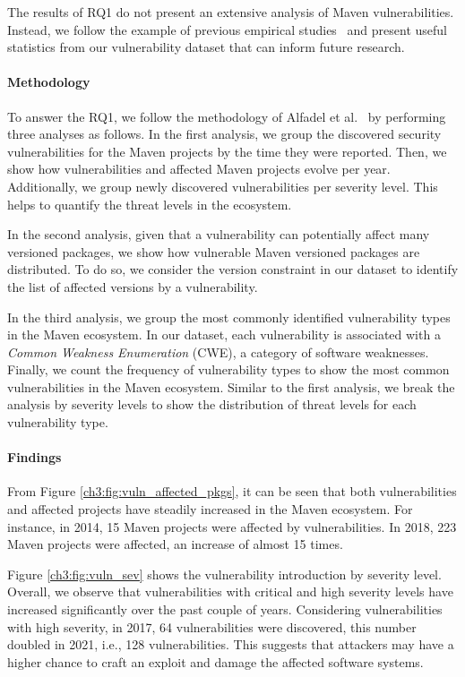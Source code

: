 The results of RQ1 do not present an extensive analysis of Maven vulnerabilities.
Instead, we follow the example of previous empirical studies~\cite{decan2018impact,alfadel2021empirical} and present useful statistics from our vulnerability dataset that can inform future research.

\paragraph{Methodology}
To answer the RQ1, we follow the methodology of Alfadel et al.~\cite{alfadel2021empirical} by performing three analyses as follows. In the first analysis, we group the discovered security vulnerabilities for the Maven projects by the time they were reported. Then, we show how vulnerabilities and affected Maven projects evolve per year. Additionally, we group newly discovered vulnerabilities per severity level. This helps to quantify the threat levels in the ecosystem.

In the second analysis, given that a vulnerability can potentially affect many versioned packages, we show how vulnerable Maven versioned packages are distributed. To do so, we consider the version constraint in our dataset to identify the list of affected versions by a vulnerability.

In the third analysis, we group the most commonly identified vulnerability types in the Maven ecosystem. In our dataset, each vulnerability is associated with a \emph{Common Weakness Enumeration} (CWE), a category of software weaknesses. Finally, we count the frequency of vulnerability types to show the most common vulnerabilities in the Maven ecosystem. Similar to the first analysis, we break the analysis by severity levels to show the distribution of threat levels for each vulnerability type. 

\paragraph{Findings}
From Figure \ref{ch3:fig:vuln_affected_pkgs}, it can be seen that both vulnerabilities and affected projects have steadily increased in the Maven ecosystem. For instance, in 2014, 15 Maven projects were affected by vulnerabilities. In 2018, 223 Maven projects were affected, an increase of almost 15 times.

Figure \ref{ch3:fig:vuln_sev} shows the vulnerability introduction by severity level. Overall, we observe that vulnerabilities with critical and high severity levels have increased significantly over the past couple of years. Considering vulnerabilities with high severity, in 2017, 64 vulnerabilities were discovered, this number doubled in 2021, i.e., 128 vulnerabilities. This suggests that attackers may have a higher chance to craft an exploit and damage the affected software systems.

